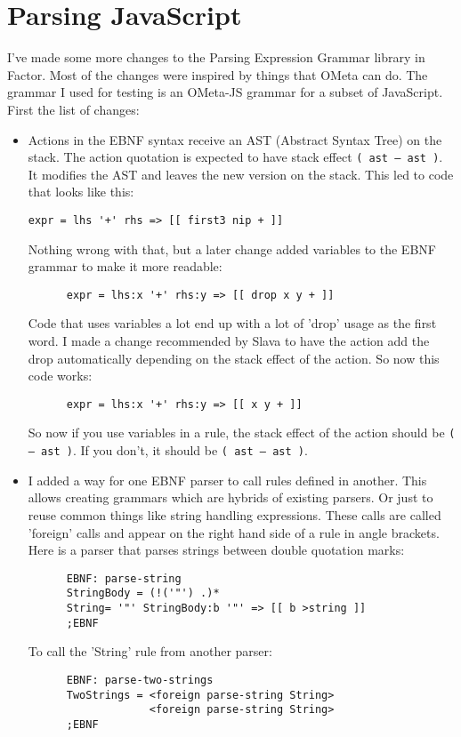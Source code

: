 \chapter{Parsing JavaScript}

I've made some more changes to the Parsing Expression Grammar library
in Factor. Most of the changes were inspired by things that OMeta can
do. The grammar I used for testing is an OMeta-JS grammar for a subset
of JavaScript. First the list of changes:

\begin{itemize}
\item Actions in the EBNF syntax receive an AST (Abstract Syntax Tree)
  on the stack. The action quotation is expected to have stack effect
  \texttt{( ast -- ast )}. It modifies the AST and leaves the new
  version on the stack. This led to code that looks like this:
\begin{verbatim}
expr = lhs '+' rhs => [[ first3 nip + ]]
\end{verbatim}

      Nothing wrong with that, but a later change added variables to
      the EBNF grammar to make it more readable:
\begin{verbatim}
      expr = lhs:x '+' rhs:y => [[ drop x y + ]]
\end{verbatim}

      Code that uses variables a lot end up with a lot of 'drop' usage
      as the first word. I made a change recommended by Slava to have
      the action add the drop automatically depending on the stack
      effect of the action. So now this code works:
\begin{verbatim}
      expr = lhs:x '+' rhs:y => [[ x y + ]]
\end{verbatim}

      So now if you use variables in a rule, the stack effect of the
      action should be \texttt{( -- ast )}. If you don't, it should be
      \texttt{( ast -- ast )}.  

\item I added a way for one EBNF parser to call rules defined in
  another. This allows creating grammars which are hybrids of existing
  parsers. Or just to reuse common things like string handling
  expressions. These calls are called 'foreign' calls and appear on
  the right hand side of a rule in angle brackets. Here is a parser
  that parses strings between double quotation marks:
\begin{verbatim}
      EBNF: parse-string
      StringBody = (!('"') .)* 
      String= '"' StringBody:b '"' => [[ b >string ]]
      ;EBNF
\end{verbatim}
      To call the 'String' rule from another parser:
\begin{verbatim}
      EBNF: parse-two-strings
      TwoStrings = <foreign parse-string String>
                   <foreign parse-string String>
      ;EBNF
\end{verbatim}


\end{itemize}
